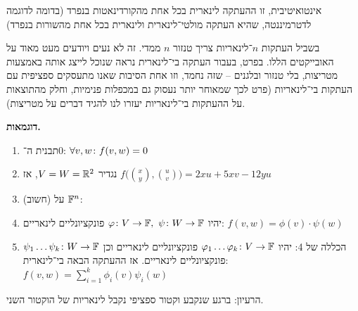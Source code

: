 \documentclass[name=רשימות אלגברה לינארית 2א]{../../../tex/classes/megasumPreamble}
\begin{document}
	אינטואיטיבית, זו ההעתקה לינארית בכל אחת מהקורדינאטות בנפרד (בדומה לדוגמה לדטרמיננטה, שהיא העתקה מולטי־לינארית ולינארית בכל אחת מהשורות בנפרד)
	
	בשביל העתקות $n$־לינאריות צריך טנזור $n$ ממדי. זה לא נעים ויודעים מעט מאוד על האובייקטים הללו. בפרט, בעבור העתקה בי־לינארית נראה שנוכל לייצג אותה באמצעות מטריצות, בלי טנזור ובלגנים – שזה נחמד, וזו אחת הסיבות שאנו מתעסקים ספציפית עם העתקות בי־לינאריות (פרט לכך שמאוחר יותר נעסוק גם במכפלות פנימיות, וחלק מהתוצאות על ההעתקות בי־לינאריות יעזרו לנו להגיד דברים על מטריצות). 
	
	\textbf{דוגמאות. }
	\begin{enumerate}
		\item תבנית ה־$0$: \hfill $\forall v,w \co f(v, w) = 0$ 
		\item נגדיר $V = W = \R^2$, אז \hfill $f\big(\binom{x}{y}, \binom{u}{v}\big) = 2xu + 5xv - 12yu$
		\item (חשוב)  על $\F^n$: 
		\item יהיו $\phi \co V \to \F, \ \psi \co W \to \F$ פונקציונליים לינאריים: \hfill $f(v, w) = \phi(v) \cdot \psi(w)$
		\item הכללה של 4: יהיו $\phi_1 \dots \phi_k \co V \to \F$ פונקציונליים לינאריים וכן $\psi_1 \dots \psi_k \co W \to \F$ פונקציונליים לינאריים. אז ההעתקה הבאה בי־לינארית: \hfill $f(v, w) = \sum_{i = 1}^{k}\phi_i(v) \psi_i(w)$
	\end{enumerate}
	הרעיון: ברגע שנקבע וקטור ספציפי נקבל לינאריות של הוקטור השני. 
	
\end{document}
